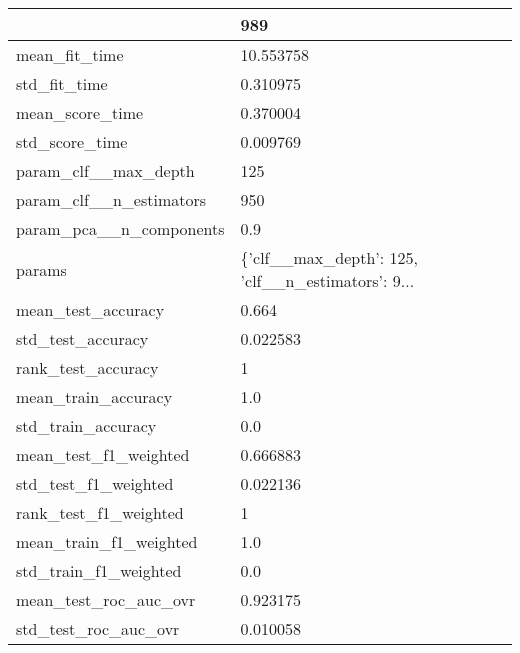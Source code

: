 \begin{tabular}{ll}
\toprule
{} &                                                989 \\
\midrule
mean\_fit\_time               &                                          10.553758 \\
std\_fit\_time                &                                           0.310975 \\
mean\_score\_time             &                                           0.370004 \\
std\_score\_time              &                                           0.009769 \\
param\_clf\_\_max\_depth        &                                                125 \\
param\_clf\_\_n\_estimators     &                                                950 \\
param\_pca\_\_n\_components     &                                                0.9 \\
params                      &  \{'clf\_\_max\_depth': 125, 'clf\_\_n\_estimators': 9... \\
mean\_test\_accuracy          &                                              0.664 \\
std\_test\_accuracy           &                                           0.022583 \\
rank\_test\_accuracy          &                                                  1 \\
mean\_train\_accuracy         &                                                1.0 \\
std\_train\_accuracy          &                                                0.0 \\
mean\_test\_f1\_weighted       &                                           0.666883 \\
std\_test\_f1\_weighted        &                                           0.022136 \\
rank\_test\_f1\_weighted       &                                                  1 \\
mean\_train\_f1\_weighted      &                                                1.0 \\
std\_train\_f1\_weighted       &                                                0.0 \\
mean\_test\_roc\_auc\_ovr       &                                           0.923175 \\
std\_test\_roc\_auc\_ovr        &                                           0.010058 \\

\end{tabular}
